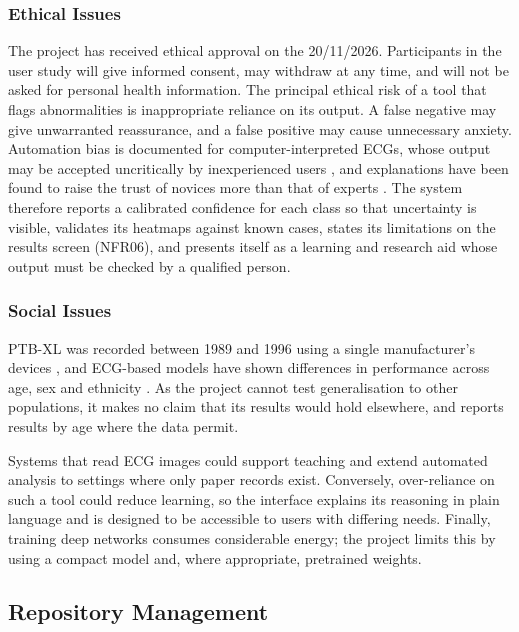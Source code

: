 \documentclass[12pt,nonacm,acmlarge,titlepage,screen]{acmart}
\begin{document}
\subsubsection{Ethical Issues}
The project has received ethical approval on the 20/11/2026. Participants in the user study will give informed consent, may withdraw at any time, and will not be asked for personal health information.
The principal ethical risk of a tool that flags abnormalities is inappropriate reliance on its output. A false negative may give unwarranted reassurance, and a false positive may cause unnecessary anxiety. Automation bias is documented for computer-interpreted ECGs, whose output may be accepted uncritically by inexperienced users \cite{schlapfer_computer-interpreted_2017}, and explanations have been found to raise the trust of novices more than that of experts \cite{cabitza_painting_2023}. The system therefore reports a calibrated confidence for each class so that uncertainty is visible, validates its heatmaps against known cases, states its limitations on the results screen (NFR06), and presents itself as a learning and research aid whose output must be checked by a qualified person.

\subsubsection{Social Issues}
PTB-XL was recorded between 1989 and 1996 using a single manufacturer's devices \cite{wagner_ptbxl_2020}, and ECG-based models have shown differences in performance across age, sex and ethnicity \cite{noseworthy_assessing_2020,perez_alday_age_2022}. As the project cannot test generalisation to other populations, it makes no claim that its results would hold elsewhere, and reports results by age where the data permit.

Systems that read ECG images could support teaching and extend automated analysis to settings where only paper records exist. Conversely, over-reliance on such a tool could reduce learning, so the interface explains its reasoning in plain language and is designed to be accessible to users with differing needs. Finally, training deep networks consumes considerable energy; the project limits this by using a compact model and, where appropriate, pretrained weights.

\subsection{Repository Management}
\label{app:repo}
\end{document}
